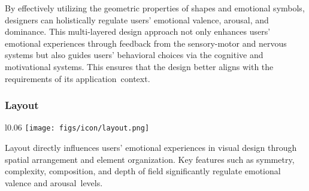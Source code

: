 
By effectively utilizing the geometric properties of shapes and emotional symbols, designers can holistically regulate users’ emotional valence, arousal, and dominance. This multi-layered design approach not only enhances users’ emotional experiences through feedback from the sensory-motor and nervous systems but also guides users’ behavioral choices via the cognitive and motivational systems. This ensures that the design better aligns with the requirements of its application~context.

\subsubsection{Layout}
\begin{wrapfigure}{l}{0.06\textwidth}
  \vspace{-11pt} %
        \texttt{[image: figs/icon/layout.png]}
\end{wrapfigure} 
Layout directly influences users’ emotional experiences in visual design through spatial arrangement and element organization. Key features such as symmetry, complexity, composition, and depth of field significantly regulate emotional valence and arousal~levels.

